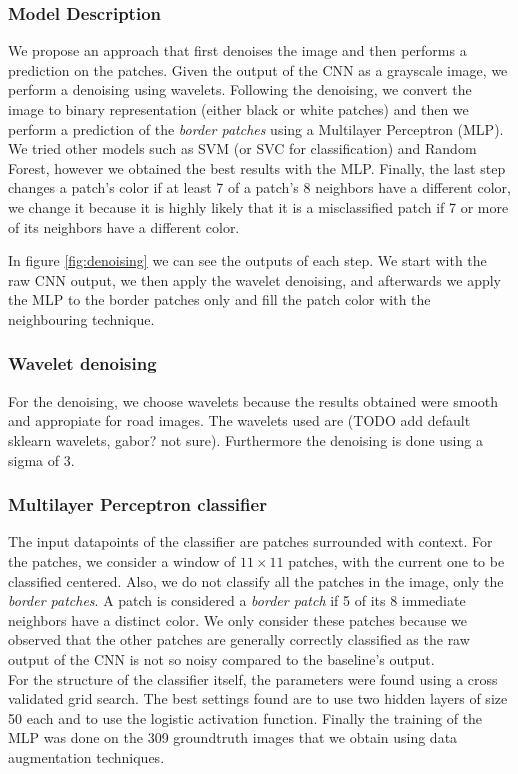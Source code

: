 \documentclass[10pt,conference,compsocconf]{IEEEtran}
\begin{document}
\subsubsection{Model Description}
We propose an approach that first denoises the image and then performs a prediction on the patches. Given the output of the CNN as a grayscale image, we perform a denoising using wavelets. Following the denoising, we convert the image to binary representation (either black or white patches) and then we perform a prediction of the \textit{border patches} using a Multilayer Perceptron (MLP). We tried other models such as SVM (or SVC for classification) and Random Forest, however we obtained the best results with the MLP. Finally, the last step changes a patch's color if at least 7 of a patch's 8 neighbors have a different color, we change it because it is highly likely that it is a misclassified patch if 7 or more of its neighbors have a different color.

In figure \ref{fig:denoising} we can see the outputs of each step. We start with the raw CNN output, we then apply the wavelet denoising, and afterwards we apply the MLP to the border patches only and fill the patch color with the neighbouring technique.
\subsubsection{Wavelet denoising}
For the denoising, we choose wavelets because the results obtained were smooth and appropiate for road images. The wavelets used are (TODO add default sklearn wavelets, gabor? not sure). Furthermore the denoising is done using a sigma of 3. 
\subsubsection{Multilayer Perceptron classifier}
The input datapoints of the classifier are patches surrounded with context. For the patches, we consider a window of $11\times11$ patches, with the current one to be classified centered. Also, we do not classify all the patches in the image, only the \textit{border patches}. A patch is considered a \textit{border patch} if 5 of its 8 immediate neighbors have a distinct color. We only consider these patches because we observed that the other patches are generally correctly classified as the raw output of the CNN is not so noisy compared to the baseline's output.\\
For the structure of the classifier itself, the parameters were found using a cross validated grid search. The best settings found are to use two hidden layers of size 50 each and to use the logistic activation function. Finally the training of the MLP was done on the 309 groundtruth images that we obtain using data augmentation techniques.
\end{document}

